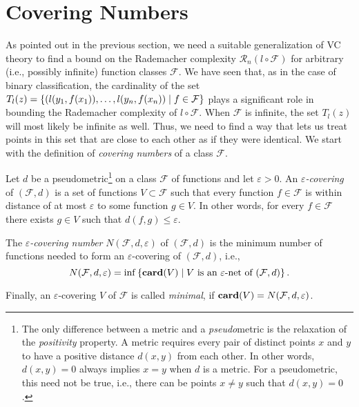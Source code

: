 \section{Covering Numbers}

As pointed out in the previous section, we need a suitable generalization of VC theory to find a bound on the Rademacher complexity $\mathcal{R}_n(l \circ \mathcal{F})$ for arbitrary (i.e., possibly infinite) function classes $\mathcal{F}$. We have seen that, as in the case of binary classification, the cardinality of the set $T_l(z) = \left\{(l(y_1, f(x_1)), \dots, l(y_n, f(x_n)) \mathrel{|} f \in \mathcal{F}\right\}$ plays a significant role in bounding the Rademacher complexity of $l \circ \mathcal{F}$. When $\mathcal{F}$ is infinite, the set $T_l(z)$ will  most likely be infinite as well. Thus, we need to find a way that lets us treat points in this set that are close to each other as if they were identical. We start with the definition of \emph{covering numbers} of a class $\mathcal{F}$.

\begin{definition}
Let $d$ be a pseudometric\footnote{The only difference between a metric and a \emph{pseudo}metric is the relaxation of the \emph{positivity} property. A metric requires every pair of distinct points $x$ and $y$ to have a positive distance $d(x, y)$ from each other. In other words, $d(x, y) = 0$ always implies $x = y$ when $d$ is a metric. For a pseudometric, this need not be true, i.e., there can be points $x \neq y$ such that $d(x, y) = 0$.} on a class $\mathcal{F}$ of functions and let $\varepsilon > 0$. An \emph{$\varepsilon$-covering} of $(\mathcal{F}, d)$ is a set of functions $V \subset \mathcal{F}$ such that every function $f \in \mathcal{F}$ is within distance of at most $\varepsilon$ to some function $g \in V$. In other words, for every $f \in \mathcal{F}$ there exists $g \in V$ such that $d(f, g) \leq \varepsilon$.

The \emph{$\varepsilon$-covering number} $N(\mathcal{F}, d, \varepsilon)$ of $(\mathcal{F}, d)$ is the minimum number of functions needed to form an $\varepsilon$-covering of $(\mathcal{F}, d)$, i.e.,
\[
    N(\mathcal{F}, d, \varepsilon) = \inf\left\{\mathrm{\mathbf{card}}(V) \mathrel{|} V \text{ is an } \varepsilon \text{-net of } (\mathcal{F}, d)\right\}.
\]

Finally, an $\varepsilon$-covering $V$ of $\mathcal{F}$ is called \emph{minimal}, if $\mathrm{\mathbf{card}}(V) = N(\mathcal{F}, d, \varepsilon)$.
\end{definition}

